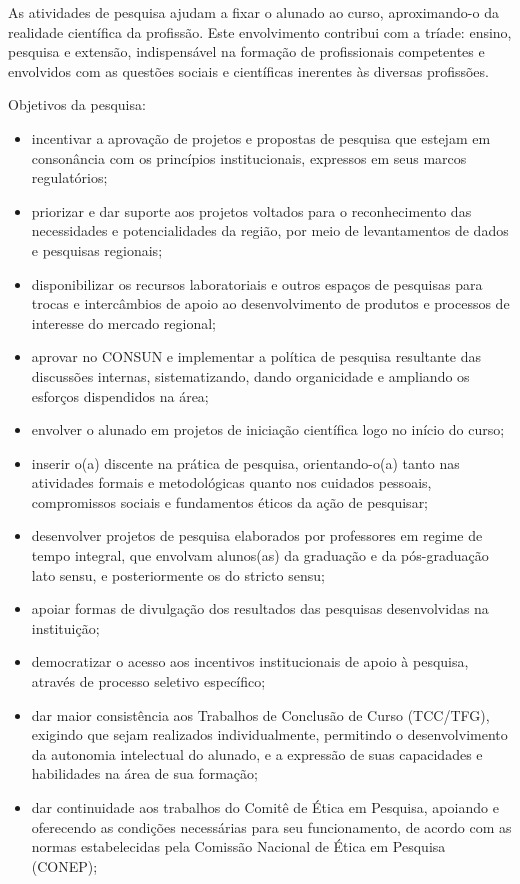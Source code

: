\documentclass[a4paper, 12pt, openright, oneside, german, french, english, brazil]{abntex2}
\begin{document}
As atividades de pesquisa ajudam a fixar o alunado ao curso, aproximando-o da realidade científica da profissão. Este envolvimento contribui com a tríade: ensino, pesquisa e extensão, indispensável na formação de profissionais competentes e envolvidos com as questões sociais e científicas inerentes às diversas profissões.

Objetivos da pesquisa:

\begin{itemize}
\item incentivar a aprovação de projetos e propostas de pesquisa que estejam em consonância com os princípios institucionais, expressos em seus marcos regulatórios;
\item priorizar e dar suporte aos projetos voltados para o reconhecimento das necessidades e potencialidades da região, por meio de levantamentos de dados e pesquisas regionais;
\item disponibilizar os recursos laboratoriais e outros espaços de pesquisas para trocas e intercâmbios de apoio ao desenvolvimento de produtos e processos de interesse do mercado regional;
\item aprovar no CONSUN e implementar a política de pesquisa resultante das discussões internas, sistematizando, dando organicidade e ampliando os esforços dispendidos na área;
\item envolver o alunado em projetos de iniciação científica logo no início do curso;
\item inserir o(a) discente na prática de pesquisa, orientando-o(a) tanto nas atividades formais e metodológicas quanto nos cuidados pessoais, compromissos sociais e fundamentos éticos da ação de pesquisar;
\item desenvolver projetos de pesquisa elaborados por professores em regime de tempo integral, que envolvam alunos(as) da graduação e da pós-graduação lato sensu, e posteriormente os do stricto sensu;
\item apoiar formas de divulgação dos resultados das pesquisas desenvolvidas na instituição;
\item democratizar o acesso aos incentivos institucionais de apoio à pesquisa, através de processo seletivo específico;
\item dar maior consistência aos Trabalhos de Conclusão de Curso (TCC/TFG), exigindo que sejam realizados individualmente, permitindo o desenvolvimento da autonomia intelectual do alunado, e a expressão de suas capacidades e habilidades na área de sua formação;
\item dar continuidade aos trabalhos do Comitê de Ética em Pesquisa, apoiando e oferecendo as condições necessárias para seu funcionamento, de acordo com as normas estabelecidas pela Comissão Nacional de Ética em Pesquisa (CONEP);

\end{itemize}
\end{document}
